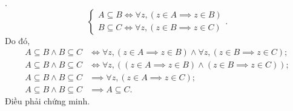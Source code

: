 .
\begin{equation*}
    \begin{cases}
        A \subseteq B \iff \forall z, (z \in A \implies z \in B) \\
        B \subseteq C \iff \forall z, (z \in B \implies z \in C)
    \end{cases}.
\end{equation*}
Do đó,
\begin{align*}
    A \subseteq B \land B \subseteq C & \iff \forall z, (z \in A \implies z \in B) \land \forall z, (z \in B \implies z \in C);    \\
    A \subseteq B \land B \subseteq C & \iff \forall z, \left( (z \in A \implies z \in B) \land (z \in B \implies z \in C)\right); \\
    A \subseteq B \land B \subseteq C & \implies \forall z, \left(z \in A \implies z \in C\right);                                 \\
    A \subseteq B \land B \subseteq C & \implies A \subseteq C.
\end{align*}
Điều phải chứng minh.